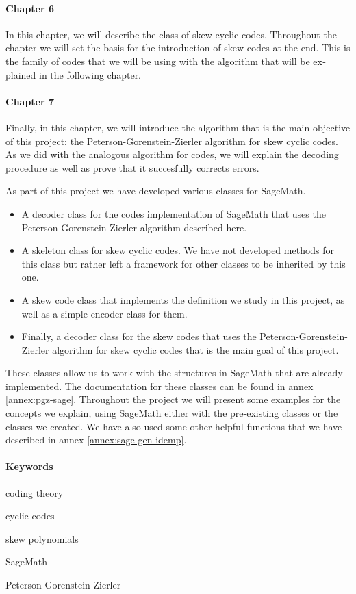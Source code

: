 \begin{otherlanguage}{english}
\paragraph{Chapter 6} In this chapter, we will describe the class of skew cyclic codes.
Throughout the chapter we will set the basis for the introduction of skew  codes at the end.
This is the family of codes that we will be using with the algorithm that will be explained in the following chapter.

\paragraph{Chapter 7} Finally, in this chapter, we will introduce the algorithm that is the main objective of this project: the Peterson-Gorenstein-Zierler algorithm for skew cyclic codes.
As we did with the analogous algorithm for  codes, we will explain the decoding procedure as well as prove that it succesfully corrects errors.

As part of this project we have developed various classes for SageMath.
\begin{itemize}
  \item A decoder class for the  codes implementation of SageMath that uses the Peterson-Gorenstein-Zierler algorithm described here.
  \item A skeleton class for skew cyclic codes. We have not developed methods for this class but rather left a framework for other classes to be inherited by this one.
  \item A skew  code class that implements the definition we study in this project, as well as a simple encoder class for them.
  \item Finally, a decoder class for the skew  codes that uses the Peterson-Gorenstein-Zierler algorithm for skew cyclic codes that is the main goal of this project.
\end{itemize}

These classes allow us to work with the structures in SageMath that are already implemented.
The documentation for these classes can be found in annex \ref{annex:pgz-sage}.
Throughout the project we will present some examples for the concepts we explain, using SageMath either with the pre-existing classes or the classes we created.
We have also used some other helpful functions that we have described in annex \ref{annex:sage-gen-idemp}.

\paragraph{Keywords}
\begin{itemize*}[label=,itemsep=4em,itemjoin=\hspace{2em}]
  \item coding theory
  \item cyclic codes 
  \item skew polynomials
  \item SageMath
  \item Peterson-Gorenstein-Zierler
\end{itemize*}

\end{otherlanguage}